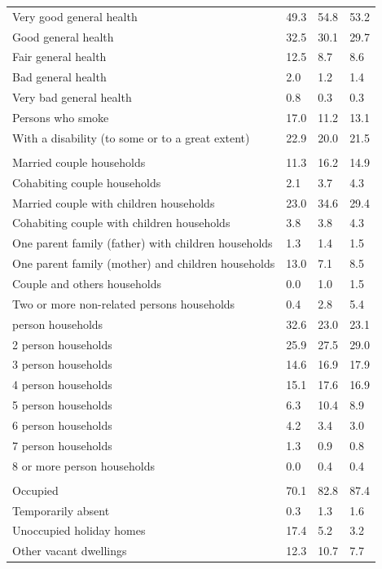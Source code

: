 \documentclass{article}
\begin{document}
\begin{table}[h]
\begin{tabular}{KTTT}
    \hline
Very good general health & 49.3& 54.8& 53.2\\
Good general health & 32.5& 30.1& 29.7\\
Fair general health & 12.5&  8.7&  8.6\\
Bad general health & 2.0& 1.2& 1.4\\
Very bad general health & 0.8& 0.3& 0.3\\
    \hline
Persons who smoke & 17.0& 11.2& 13.1\\
    \hline
With a disability (to some or to a great extent) & 22.9& 20.0& 21.5\\
\hline
    \\ 
    \hline
Married couple households & 11.3& 16.2& 14.9\\
Cohabiting couple households & 2.1& 3.7& 4.3\\
Married couple with children households & 23.0& 34.6& 29.4\\
Cohabiting couple with children households & 3.8& 3.8& 4.3\\
One parent family (father) with  children households & 1.3& 1.4& 1.5\\
One parent family (mother) and children households & 13.0&  7.1&  8.5\\
Couple and others households  & 0.0& 1.0& 1.5\\
Two or more non-related persons households & 0.4& 2.8& 5.4\\
     person households & 32.6& 23.0& 23.1\\
2 person households & 25.9& 27.5& 29.0\\
3 person households & 14.6& 16.9& 17.9\\
4 person households & 15.1& 17.6& 16.9\\
5 person households &  6.3& 10.4&  8.9\\
6 person households & 4.2& 3.4& 3.0\\
7 person households & 1.3& 0.9& 0.8\\
8 or more person households & 0.0& 0.4& 0.4\\
\hline
    \\ 
    \hline
Occupied & 70.1& 82.8& 87.4\\
Temporarily absent & 0.3& 1.3& 1.6\\
Unoccupied holiday homes & 17.4&  5.2&  3.2\\
Other vacant dwellings & 12.3& 10.7&  7.7\\
\hline
\end{tabular}
\end{table}
\end{document}
